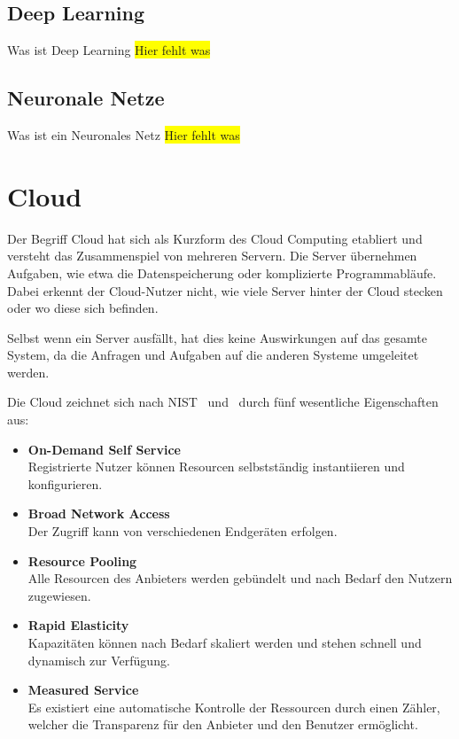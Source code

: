 \subsection{Deep Learning}
Was ist Deep Learning
\colorbox{yellow}{Hier fehlt was}

\subsection{Neuronale Netze}
Was ist ein Neuronales Netz
\colorbox{yellow}{Hier fehlt was}

\section{Cloud}
Der Begriff Cloud hat sich als Kurzform des Cloud Computing etabliert und versteht das Zusammenspiel von mehreren Servern.
Die Server übernehmen Aufgaben, wie etwa die Datenspeicherung oder komplizierte Programmabläufe. Dabei erkennt der
Cloud-Nutzer nicht, wie viele Server hinter der Cloud stecken oder wo diese sich befinden.

Selbst wenn ein Server ausfällt, hat dies keine Auswirkungen auf das gesamte System, da die Anfragen und Aufgaben auf
die anderen Systeme umgeleitet werden.

Die Cloud zeichnet sich nach NIST~\cite{online_grundlagen_cloud_nist} und~\cite{online_grundlagen_cloud_computing} durch
fünf wesentliche Eigenschaften aus:

\begin{itemize}
    \item \textbf{On-Demand Self Service} \\
    Registrierte Nutzer können Resourcen selbstständig instantiieren und konfigurieren.
    \item \textbf{Broad Network Access} \\
    Der Zugriff kann von verschiedenen Endgeräten erfolgen.
    \item \textbf{Resource Pooling} \\
    Alle Resourcen des Anbieters werden gebündelt und nach Bedarf den Nutzern zugewiesen.
    \item \textbf{Rapid Elasticity} \\
    Kapazitäten können nach Bedarf skaliert werden und stehen schnell und dynamisch zur Verfügung.
    \item \textbf{Measured Service} \\
    Es existiert eine automatische Kontrolle der Ressourcen durch einen Zähler, welcher die Transparenz für den
    Anbieter und den Benutzer ermöglicht.
\end{itemize}


